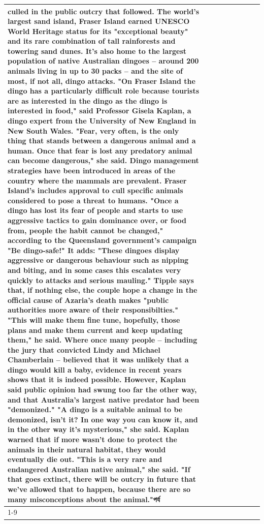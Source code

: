 \begin{table}[H]
\begin{tabular}{lllrlllll}
culled in the public outcry that followed. The world's largest sand island, Fraser Island earned UNESCO World Heritage status for its "exceptional beauty" and its rare combination of tall rainforests and towering sand dunes. It's also home to the largest population of native Australian dingoes -- around 200 animals living in up to 30 packs -- and the site of most, if not all, dingo attacks. "On Fraser Island the dingo has a particularly difficult role because tourists are as interested in the dingo as the dingo is interested in food," said Professor Gisela Kaplan, a dingo expert from the University of New England in New South Wales. "Fear, very often, is the only thing that stands between a dangerous animal and a human. Once that fear is lost any predatory animal can become dangerous," she said. Dingo management strategies have been introduced in areas of the country where the mammals are prevalent. Fraser Island's includes approval to cull specific animals considered to pose a threat to humans. "Once a dingo has lost its fear of people and starts to use aggressive tactics to gain dominance over, or food from, people the habit cannot be changed," according to the Queensland government's campaign "Be dingo-safe!" It adds: "These dingoes display aggressive or dangerous behaviour such as nipping and biting, and in some cases this escalates very quickly to attacks and serious mauling." Tipple says that, if nothing else, the couple hope a change in the official cause of Azaria's death makes "public authorities more aware of their responsibilties." "This will make them fine tune, hopefully, those plans and make them current and keep updating them," he said. Where once many people -- including the jury that convicted Lindy and Michael Chamberlain -- believed that it was unlikely that a dingo would kill a baby, evidence in recent years shows that it is indeed possible. However, Kaplan said public opinion had swung too far the other way, and that Australia's largest native predator had been "demonized." "A dingo is a suitable animal to be demonized, isn't it? In one way you can know it, and in the other way it's mysterious," she said. Kaplan warned that if more wasn't done to protect the animals in their natural habitat, they would eventually die out. "This is a very rare and endangered Australian native animal," she said. "If that goes extinct, there will be outcry in future that we've allowed that to happen, because there are so many misconceptions about the animal."পর্য \\
\cline{1-9}

\end{tabular}
\end{table}
